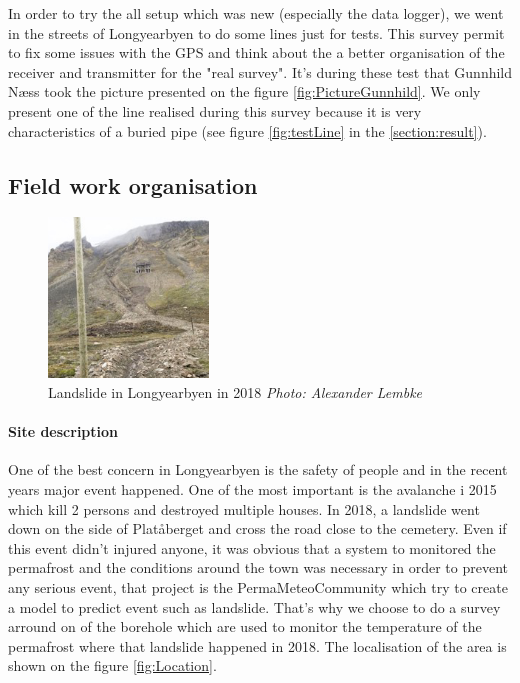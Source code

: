 In order to try the all setup which was new (especially the data logger), we went in the streets of Longyearbyen to do some lines just for tests. This survey permit to fix some issues with the GPS and think about the a better organisation of the receiver and transmitter for the "real survey". It's during these test that Gunnhild Næss took the picture presented on the figure \ref{fig:PictureGunnhild}. We only present one of the line realised during this survey because it is very characteristics of a buried pipe (see figure \ref{fig:testLine} in the \ref{section:result}).

\newpage
\subsection{Field work organisation}

\begin{figure}
    \centering
    \includegraphics[width=0.38\textwidth]{Images/00_Methodology/LandSlide2018.jpg}
    \caption{Landslide in Longyearbyen in 2018 \emph{Photo: Alexander Lembke} \cite{Landslide2018Longyeabyen}}
    \label{fig:Landslide2018}
\end{figure}

\paragraph{Site description} \label{Paragraph:SiteDescription}

One of the best concern in Longyearbyen is the safety of people and in the recent years major event happened. One of the most important is the avalanche i 2015 which kill 2 persons and destroyed multiple houses. In 2018, a landslide went down on the side of Platåberget and cross the road close to the cemetery. Even if this event didn't injured anyone, it was obvious that a system to monitored the permafrost and the conditions around the town was necessary in order to prevent any serious event, that project is the PermaMeteoCommunity \cite{PermaMeteoCommunity} which try to create a model to predict event such as landslide. That's why we choose to do a survey arround on of the borehole which are used to monitor the temperature of the permafrost where that landslide happened in 2018. The localisation of the area is shown on the figure \ref{fig:Location}.




